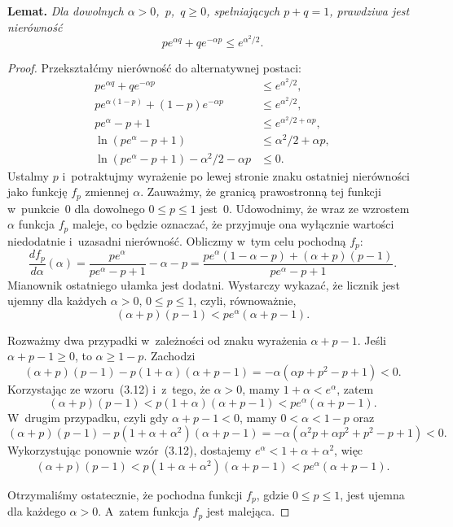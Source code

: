\exercise %

\noindent\textsf{\textbf{Lemat.}} \textit{Dla dowolnych $\alpha>0$,~\/$p$,~\/$q\ge0$, spełniających\/ $p+q=1$, prawdziwa jest nierówność}
	\[
		pe^{\alpha q}+qe^{-\alpha p} \le e^{\alpha^2\!/2}.
	\]
\begin{proof}
	Przekształćmy nierówność do alternatywnej postaci:
	\begin{align*}
		pe^{\alpha q}+qe^{-\alpha p} &\le e^{\alpha^2\!/2}, \\
		pe^{\alpha(1-p)}+(1-p)e^{-\alpha p} &\le e^{\alpha^2\!/2}, \\
		pe^\alpha-p+1 &\le e^{\alpha^2\!/2+\alpha p}, \\
		\ln(pe^\alpha-p+1) &\le \alpha^2\!/2+\alpha p, \\
		\ln(pe^\alpha-p+1)-\alpha^2\!/2-\alpha p &\le 0.
	\end{align*}
	Ustalmy $p$ i~potraktujmy wyrażenie po lewej stronie znaku ostatniej nierówności jako funkcję $f_p$ zmiennej $\alpha$. Zauważmy, że granicą prawostronną tej funkcji w~punkcie~0 dla dowolnego $0\le p\le1$ jest~0. Udowodnimy, że wraz ze wzrostem $\alpha$ funkcja $f_p$ maleje, co będzie oznaczać, że przyjmuje ona wyłącznie wartości niedodatnie i~uzasadni nierówność. Obliczmy w~tym celu pochodną $f_p$:
	\[
	    \frac{df_p}{d\alpha}(\alpha) = \frac{pe^\alpha}{pe^\alpha-p+1}-\alpha-p = \frac{pe^\alpha(1-\alpha-p)+(\alpha+p)(p-1)}{pe^\alpha-p+1}.
	\]
	Mianownik ostatniego ułamka jest dodatni. Wystarczy wykazać, że licznik jest ujemny dla każdych $\alpha>0$, $0\le p\le1$, czyli, równoważnie,
	\[
	    (\alpha+p)(p-1) < pe^\alpha(\alpha+p-1).
	\]

	Rozważmy dwa przypadki w~zależności od znaku wyrażenia $\alpha+p-1$. Jeśli $\alpha+p-1\ge0$, to $\alpha\ge1-p$. Zachodzi
	\[
	    (\alpha+p)(p-1)-p(1+\alpha)(\alpha+p-1) = -\alpha(\alpha p+p^2-p+1) < 0.
	\]
	Korzystając ze wzoru~(3.12) i~z~tego, że $\alpha>0$, mamy $1+\alpha<e^\alpha$, zatem
	\[
	    (\alpha+p)(p-1) < p(1+\alpha)(\alpha+p-1) < pe^\alpha(\alpha+p-1).
	\]
	W~drugim przypadku, czyli gdy $\alpha+p-1<0$, mamy $0<\alpha<1-p$ oraz
	\[
	    (\alpha+p)(p-1)-p(1+\alpha+\alpha^2)(\alpha+p-1) = -\alpha(\alpha^2p+\alpha p^2+p^2-p+1) < 0.
	\]
	Wykorzystując ponownie wzór~(3.12), dostajemy $e^\alpha<1+\alpha+\alpha^2$, więc
	\[
		(\alpha+p)(p-1) < p(1+\alpha+\alpha^2)(\alpha+p-1) < pe^\alpha(\alpha+p-1).
	\]

	Otrzymaliśmy ostatecznie, że pochodna funkcji $f_p$, gdzie $0\le p\le1$, jest ujemna dla każdego $\alpha>0$. A~zatem funkcja $f_p$ jest malejąca.
\end{proof}

